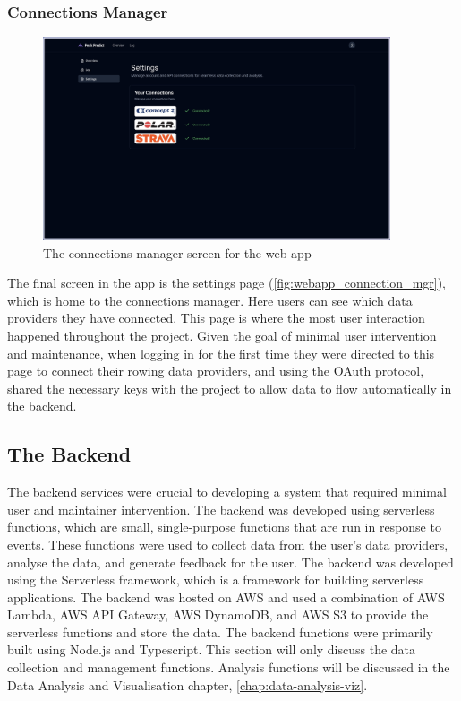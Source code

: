 \subsubsection{Connections Manager}

\begin{figure}[htbp]
  \centering
  \includegraphics[height=6cm]{figures/fyp_connections_page.jpeg}
  \captionsetup{justification=centering}
  \caption[Web app Connections Manager]{\label{fig:webapp_connection_mgr}The connections manager screen for the web app} 
\end{figure}
The final screen in the app is the settings page (\autoref{fig:webapp_connection_mgr}), which is home to the connections manager. Here users can see which data providers they have connected. This page is where the most user interaction happened throughout the project. Given the goal of minimal user intervention and maintenance, when logging in for the first time they were directed to this page to connect their rowing data providers, and using the OAuth protocol, shared the necessary keys with the project to allow data to flow automatically in the backend.  

\subsection{The Backend}
The backend services were crucial to developing a system that required minimal user and maintainer intervention. The backend was developed using serverless functions, which are small, single-purpose functions that are run in response to events. These functions were used to collect data from the user's data providers, analyse the data, and generate feedback for the user. The backend was developed using the Serverless framework, which is a framework for building serverless applications. The backend was hosted on AWS and used a combination of AWS Lambda, AWS API Gateway, AWS DynamoDB, and AWS S3 to provide the serverless functions and store the data. The backend functions were primarily built using Node.js and Typescript. This section will only discuss the data collection and management functions. Analysis functions will be discussed in the Data Analysis and Visualisation chapter, \autoref{chap:data-analysis-viz}.

